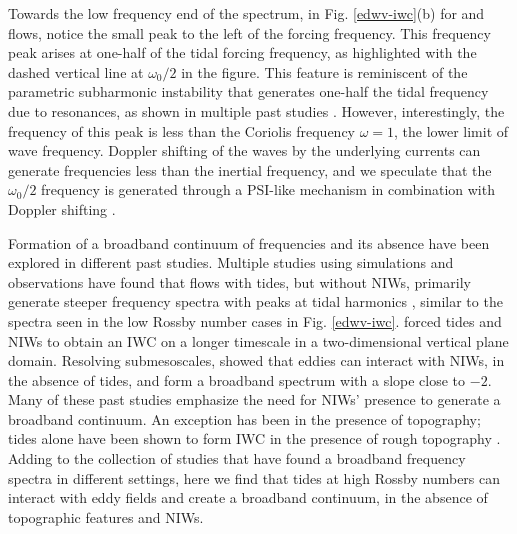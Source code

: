 \documentclass[../Rajarshi-thesis-draft.tex]{subfiles}
\begin{document}
    
Towards the low frequency end of the spectrum, in Fig. \ref{edwv-iwc}(b) for \hro and \iro flows, notice the small peak to the left of the forcing frequency. This frequency peak arises at one-half of the tidal forcing frequency, as highlighted with the dashed vertical line at $\omega_0/2$ in the figure. This feature is reminiscent of the parametric subharmonic instability that generates one-half the tidal frequency due to resonances, as shown in multiple past studies \citep{MacKinnon_Winters_2005, chen2019,wang2024}. However, interestingly, the frequency of this peak is less than the Coriolis frequency $\omega = 1$, the lower limit of wave frequency.  Doppler shifting of the waves by the underlying currents can generate frequencies less than the inertial frequency, and we speculate that the  $\omega_0/2$ frequency is  generated through a PSI-like mechanism in combination with Doppler shifting  \citep{shakespeare2020}.

Formation of a broadband continuum of frequencies  and its absence have been explored in different past studies. Multiple studies using simulations and observations have found that flows with tides, but without NIWs, primarily generate steeper frequency spectra with peaks at tidal harmonics \citep{rolland2025,hiron2025}, similar to the spectra seen in the low Rossby number cases in Fig. \ref{edwv-iwc}. \citet{sugiyama2009} forced tides and NIWs to obtain an IWC on a longer timescale in a two-dimensional vertical plane domain. Resolving submesoscales, \citet{Yang_etal_2023} showed that eddies can interact with NIWs, in the absence of tides, and form a broadband spectrum with a slope close to $-2$. Many of these past studies emphasize the need for NIWs' presence  to generate a broadband continuum. An exception has been in the presence of topography; tides alone have been shown to form IWC in the presence of rough topography \citep{chen2019}. Adding to the collection of studies that have found a broadband frequency spectra in different settings, here we find that tides at high Rossby numbers can interact with eddy fields and create a broadband continuum, in the absence of topographic features and NIWs. %
	
\end{document}
